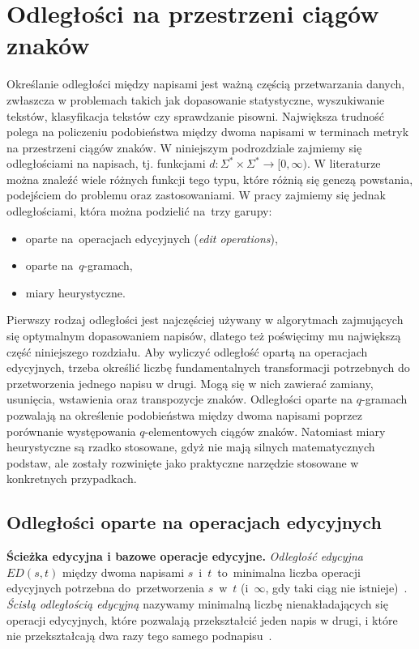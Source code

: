 \documentclass{praca1}
\begin{document}
\section{Odległości na przestrzeni ciągów znaków}

Określanie odległości między napisami jest ważną częścią przetwarzania danych, zwłaszcza w problemach takich jak dopasowanie statystyczne, wyszukiwanie tekstów, klasyfikacja tekstów czy sprawdzanie pisowni. Największa trudność polega na policzeniu podobieństwa między dwoma napisami w terminach metryk na przestrzeni ciągów znaków.  W niniejszym podrozdziale zajmiemy się odległościami na napisach, tj. funkcjami $d: \Sigma^* \times \Sigma^* \rightarrow [0, \infty)$. W literaturze można znaleźć wiele różnych funkcji tego typu, które różnią się genezą powstania, podejściem do problemu oraz zastosowaniami. W pracy zajmiemy się jednak odległościami, która można podzielić na~trzy garupy:
\begin{itemize}
\item oparte na~operacjach edycyjnych (\emph{edit operations}),
\item oparte na~$q$-gramach,
\item miary heurystyczne.
\end{itemize}


Pierwszy rodzaj odległości jest najczęściej używany w algorytmach zajmujących się optymalnym dopasowaniem napisów, dlatego też poświęcimy mu największą część niniejszego rozdziału. Aby wyliczyć odległość opartą na operacjach edycyjnych, trzeba określić liczbę fundamentalnych transformacji potrzebnych do przetworzenia jednego napisu w drugi. Mogą się w nich zawierać zamiany, usunięcia, wstawienia oraz transpozycje znaków. Odległości oparte na $q$-gramach pozwalają na określenie podobieństwa między dwoma napisami poprzez porównanie występowania $q$-elementowych ciągów znaków. Natomiast miary heurystyczne są rzadko stosowane, gdyż nie mają silnych matematycznych podstaw, ale zostały rozwinięte jako praktyczne narzędzie stosowane w konkretnych przypadkach.

\subsection{Odległości oparte na operacjach edycyjnych}

\textbf{Ścieżka edycyjna i bazowe operacje edycyjne.} \emph{Odległość edycyjna} $ED(s,t)$ między dwoma napisami $s$~i~$t$~to~minimalna liczba operacji edycyjnych potrzebna do~przetworzenia $s$~w~$t$ (i~$\infty$, gdy taki ciąg nie istnieje)~\cite{Navarro2001:guidedtour}. \emph{Ścisłą odległością edycyjną} nazywamy minimalną liczbę nienakładających się operacji edycyjnych, które pozwalają przekształcić jeden napis w drugi, i które nie przekształcają dwa razy tego samego podnapisu~\cite{Boytsov2011:indexingmethods}.
\end{document}
